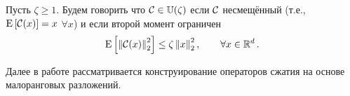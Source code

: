 \documentclass{article}
\begin{document}
\begin{definition}
Пусть $\zeta \geq 1$. Будем говорить что ${\cal C}\in \mathbb{U}(\zeta)$ если ${\cal C}$ несмещённый (т.е., ${{\rm E}}\left[{\cal C}(x)\right]=x$  $\forall x$) и если второй момент ограничен 
\begin{equation}
 {{\rm E}}\left[ \left\| {\cal C}(x) \right\|_2^2 \right] \leq \zeta  \left\| x \right\|_2^2, \qquad \forall x\in\mathbb{R}^d \,.
\end{equation} 

\end{definition}

Далее в работе рассматривается конструирование операторов сжатия на основе малоранговых разложений. 






\end{document}
